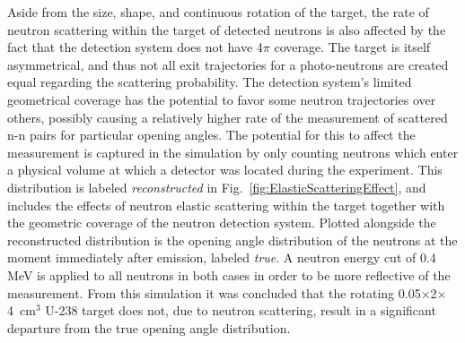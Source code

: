 Aside from the size, shape, and continuous rotation of the target, the rate of neutron scattering within the target of detected neutrons is also affected by the fact that the detection system does not have 4$\pi$ coverage.
The target is itself asymmetrical, and thus not all exit trajectories for a photo-neutrons are created equal regarding the scattering probability.
The detection system's limited geometrical coverage has the potential to favor some neutron trajectories over others, possibly causing a relatively higher rate of the measurement of scattered n-n pairs for particular opening angles.
The potential for this to affect the measurement is captured in the simulation by only counting neutrons which enter a physical volume at which a detector was located during the experiment.
This distribution is labeled \emph{reconstructed} in Fig.~\ref{fig:ElasticScatteringEffect}, and includes the effects of neutron elastic scattering within the target together with the geometric coverage of the neutron detection system.
Plotted alongside the reconstructed distribution is the opening angle distribution of the neutrons at the moment immediately after emission, labeled \emph{true}.
A neutron energy cut of 0.4 MeV is applied to all neutrons in both cases in order to be more reflective of the measurement.
From this simulation it was concluded that the rotating 0.05$\times$2$\times$4~cm$^3$ U-238 target does not, due to neutron scattering, result in a significant departure from the true opening angle distribution.
